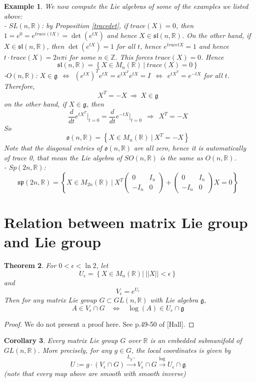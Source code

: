 \documentclass[11pt]{book}
\newtheorem{theorem}{Theorem}[section]
\newtheorem{corollary}[theorem]{Corollary}
\newtheorem{example}[theorem]{Example}
\newcommand{\bb}[1]{\mathbb{#1}}
\newcommand{\mf}[1]{\mathfrak{#1}}
\begin{document}
\begin{example}
We now compute the Lie algebras of some of the examples we listed above:\\
- $SL(n,\bb{R})$: by Proposition \ref{tracedet}, if $trace(X) = 0$, then $1 = e^0 = e^{trace(tX)} = \det(e^{tX})$ and hence $X \in \mf{sl}(n,\bb{R})$. On the other hand, if $X \in \mf{sl}(n,\bb{R})$, then $\det(e^{tX}) = 1$ for all $t$, hence $e^{trace{tX}} = 1$ and hence $t\cdot trace(X) = 2n\pi i$ for some $n \in \bb{Z}$. This forces $trace(X) = 0$. Hence
$$\mf{sl}(n,\bb{R}) = \left\{ X \in M_n(\bb{R})\ \Big|\ trace(X) = 0 \right\}$$
-$O(n,\bb{R})$: $X \in \mf{g}\ \ \Longleftrightarrow \ \ (e^{tX})^Te^{tX} = e^{tX^T}e^{tX} = I \ \ \Longleftrightarrow \ \ e^{tX^T} = e^{-tX}$ for all $t$. Therefore,
$$X^T = -X\  \Longrightarrow\ X \in \mf{g}$$
on the other hand, if $X \in \mf{g}$, then
$$\frac{d}{dt}e^{tX^T}  \Big|_{t = 0} = \frac{d}{dt}e^{-tX}  \Big|_{t=0}\ \ \Longrightarrow\ \ X^T = -X$$
So
$$\mf{o}(n,\bb{R}) = \left\{ X \in M_n(\bb{R})\ \Big|\ X^T = -X \right\}$$
Note that the diagonal entries of $\mf{o}(n,\bb{R})$ are all zero, hence it is automatically of trace 0, that mean the Lie algebra of $SO(n,\bb{R})$ is the same as $O(n,\bb{R})$.\\
- $Sp(2n,\bb{R})$:
$$\mf{sp}(2n,\bb{R}) = \left\{ X \in M_{2n}(\bb{R})\ \Big|\ X^T\left( \begin{array}{cc}
0 & I_n  \\
-I_n & 0 \end{array} \right) + \left( \begin{array}{cc}
0 & I_n  \\
-I_n & 0 \end{array} \right)X = 0 \right\}$$
\end{example}

\section{Relation between matrix Lie group and Lie group}
\begin{theorem} \label{explog}
For $0 < \epsilon < \ln 2$, let
$$U_{\epsilon} = \left\{X \in M_n(\bb{R})|\ ||X||<\epsilon \right\}$$ and
$$V_{\epsilon} = e^{U_{\epsilon}}$$
Then for any matrix Lie group $G \subset GL(n,\bb{R})$ with Lie algebra $\mf{g}$,
$$A \in V_{\epsilon} \cap G \ \ \ \  \Longleftrightarrow \ \ \ \ \log(A) \in U_{\epsilon} \cap \mf{g}$$
\end{theorem}
\begin{proof}
We do not present a proof here. See p.49-50 of [Hall].
\end{proof}
\begin{corollary} \label{embed}
Every matrix Lie group $G$ over $\bb{R}$ is an embedded submanifold of $GL(n,\bb{R})$. More precisely, for any $g \in G$, the local coordinates is given by
$$U := g\cdot (V_{\epsilon} \cap G) \stackrel{L_{g^{-1}}}{\longrightarrow} V_{\epsilon} \cap G \stackrel{\log}{\longrightarrow}  U_{\epsilon} \cap \mf{g}$$
(note that every map above are smooth with smooth inverse)
\end{corollary}
\end{document}
